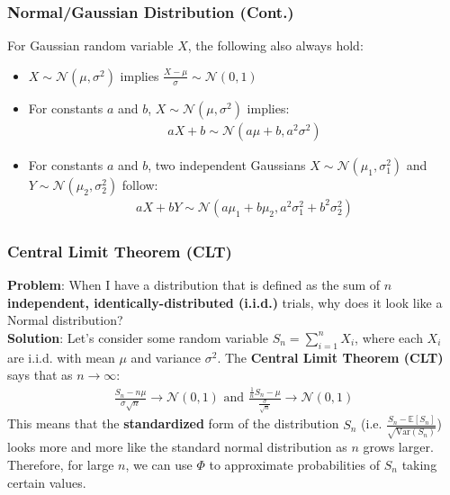 \documentclass{beamer}
\begin{document}
\begin{frame}
    \frametitle{Normal/Gaussian Distribution (Cont.)}
    For Gaussian random variable $X$, the following also always hold:
    \begin{itemize}
        \item $X\sim\mathcal{N}(\mu,\sigma^2)$ implies $\frac{X-\mu}{\sigma}\sim\mathcal{N}(0,1)$
        \item For constants $a$ and $b$, $X\sim\mathcal{N}(\mu,\sigma^2)$ implies:
        \begin{align*}
            aX+b\sim\mathcal{N}(a\mu+b,a^2\sigma^2)
        \end{align*}
        \item For constants $a$ and $b$, two independent Gaussians $X\sim\mathcal{N}(\mu_1,\sigma_1^2)$ and $Y\sim\mathcal{N}(\mu_2,\sigma_2^2)$ follow:
        \begin{align*}
            aX+bY\sim\mathcal{N}(a\mu_1+b\mu_2,a^2\sigma_1^2+b^2\sigma_2^2)
        \end{align*}
    \end{itemize}
\end{frame}

\begin{frame}
    \frametitle{Central Limit Theorem (CLT)}
    {\bf Problem}: When I have a distribution that is defined as the sum of $n$ {\bf independent, identically-distributed (i.i.d.)} trials, why does it look like a Normal distribution?\\
    {\bf Solution}: Let's consider some random variable $S_n=\sum_{i=1}^nX_i$, where each $X_i$ are i.i.d. with mean $\mu$ and variance $\sigma^2$. The {\bf Central Limit Theorem (CLT)} says that as $n\rightarrow\infty$:
    \begin{align*}
        \frac{S_n-n\mu}{\sigma\sqrt{n}}\rightarrow\mathcal{N}(0,1)\text{ and }\frac{\frac{1}{n}S_n-\mu}{\frac{\sigma}{\sqrt{n}}}\rightarrow\mathcal{N}(0,1)
    \end{align*}
    This means that the {\bf standardized} form of the distribution $S_n$ (i.e. $\frac{S_n-\mathbb{E}[S_n]}{\sqrt{\text{Var}(S_n)}}$) looks more and more like the standard normal distribution as $n$ grows larger. Therefore, for large $n$, we can use $\Phi$ to approximate probabilities of $S_n$ taking certain values.
\end{frame}
\end{document}
